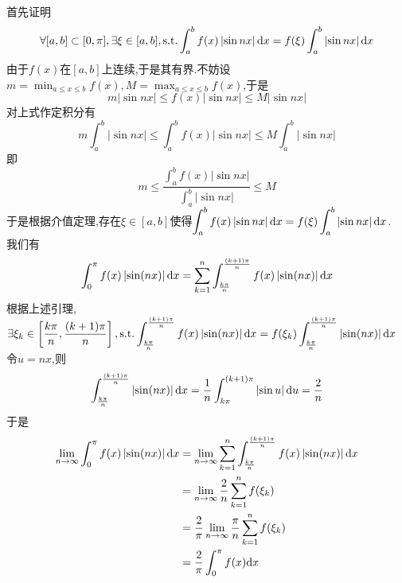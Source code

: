 \documentclass{ctexart}
\begin{document}
\begin{solution}[Proof.]
    首先证明$$\forall[a,b]\subset[0,\pi],\exists \xi\in[a,b],\text{s.t.} \int_a^bf(x)\left|\sin nx\right|\mathrm{d} x=f(\xi)\int_a^b\left|\sin nx\right|\mathrm{d} x$$
    由于$f(x)$在$[a,b]$上连续,于是其有界.不妨设$\displaystyle m=\min_{a\leqslant x\leqslant b}f(x),M=\max_{a\leqslant x\leqslant b}f(x)$,于是
    $$m\left|\sin nx\right|\leqslant f(x)\left|\sin nx\right|\leqslant M\left|\sin nx\right|$$
    对上式作定积分有
    $$m\int_a^b\left|\sin nx\right|\leqslant\int_a^bf(x)\left|\sin nx\right|\leqslant M\int_a^b\left|\sin nx\right|$$
    即$$m\leqslant\dfrac{\int_a^b f(x)\left|\sin nx\right|}{\int_a^b\left|\sin nx\right|}\leqslant M$$
    于是根据介值定理,存在$\xi\in[a,b]$使得$\displaystyle \int_a^bf(x)\left|\sin nx\right|\mathrm{d} x=f(\xi)\int_a^b\left|\sin nx\right|\mathrm{d} x$.\\
    我们有$$\int_0^\pi f(x)\left|\sin (nx)\right|\mathrm{d} x=\sum_{k=1}^{n}\int_{\frac{k\pi}{n}}^{\frac{(k+1)\pi}{n}}f(x)\left|\sin(nx)\right|\mathrm{d} x$$
    根据上述引理,$\displaystyle\exists\xi_k\in\left[\dfrac{k\pi}{n},\dfrac{(k+1)\pi}{n}\right],\text{s.t.}\int_{\frac{k\pi}{n}}^{\frac{(k+1)\pi}{n}}f(x)\left|\sin(nx)\right|\mathrm{d} x=f(\xi_k)\int_{\frac{k\pi}{n}}^{\frac{(k+1)\pi}{n}}\left|\sin(nx)\right|\mathrm{d} x$\\
    令$u=nx$,则$$\int_{\frac{k\pi}{n}}^{\frac{(k+1)\pi}{n}}\left|\sin(nx)\right|\mathrm{d} x=\dfrac{1}{n}\int_{k\pi}^{(k+1)\pi}\left|\sin u\right|\mathrm{d} u=\dfrac{2}{n}$$
    于是$$\begin{aligned}
        \lim_{n\to\infty}\int_0^\pi f(x)\left|\sin (nx)\right|\mathrm{d} x
        &= \lim_{n\to\infty}\sum_{k=1}^{n}\int_{\frac{k\pi}{n}}^{\frac{(k+1)\pi}{n}}f(x)\left|\sin(nx)\right|\mathrm{d} x \\
        &= \lim_{n\to\infty}\dfrac{2}{n}\sum_{k=1}^nf(\xi_k) \\
        &= \dfrac{2}{\pi}\lim_{n\to\infty}\dfrac{\pi}{n}\sum_{k=1}^{n}f(\xi_k) \\
        &= \dfrac{2}{\pi}\int_0^\pi f(x)\mathrm{d} x
    \end{aligned}$$
\end{solution}
\end{document}
